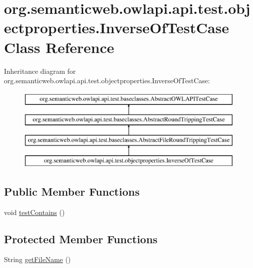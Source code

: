 \hypertarget{classorg_1_1semanticweb_1_1owlapi_1_1api_1_1test_1_1objectproperties_1_1_inverse_of_test_case}{\section{org.\-semanticweb.\-owlapi.\-api.\-test.\-objectproperties.\-Inverse\-Of\-Test\-Case Class Reference}
\label{classorg_1_1semanticweb_1_1owlapi_1_1api_1_1test_1_1objectproperties_1_1_inverse_of_test_case}
}
Inheritance diagram for org.\-semanticweb.\-owlapi.\-api.\-test.\-objectproperties.\-Inverse\-Of\-Test\-Case\-:\begin{figure}[H]
\begin{center}
\leavevmode
\includegraphics[height=4.000000cm]{classorg_1_1semanticweb_1_1owlapi_1_1api_1_1test_1_1objectproperties_1_1_inverse_of_test_case}
\end{center}
\end{figure}
\subsection*{Public Member Functions}
\begin{DoxyCompactItemize}
\item 
void \hyperlink{classorg_1_1semanticweb_1_1owlapi_1_1api_1_1test_1_1objectproperties_1_1_inverse_of_test_case_a2f3330833dfd88e34bfbbf52ae92a7e4}{test\-Contains} ()
\end{DoxyCompactItemize}
\subsection*{Protected Member Functions}
\begin{DoxyCompactItemize}
\item 
String \hyperlink{classorg_1_1semanticweb_1_1owlapi_1_1api_1_1test_1_1objectproperties_1_1_inverse_of_test_case_a7c879eb639c8182c96128d15d303064d}{get\-File\-Name} ()
\end{DoxyCompactItemize}


